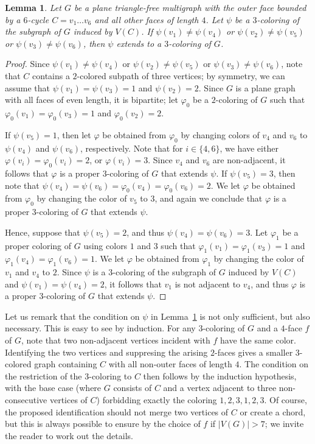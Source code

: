 \documentclass[12pt,twoside,openright,a4paper]{book}
\newtheorem{lemma}[theorem]{Lemma}
\begin{document}
\begin{lemma}\label{lemma:extend6}
Let $G$ be a plane triangle-free multigraph with the outer face bounded by a $6$-cycle $C=v_1\ldots v_6$ and all other
faces of length $4$.  Let $\psi$ be a $3$-coloring of the subgraph of $G$ induced by $V(C)$.
If $\psi(v_1)\neq\psi(v_4)$ or $\psi(v_2)\neq\psi(v_5)$ or $\psi(v_3)\neq\psi(v_6)$,
then $\psi$ extends to a $3$-coloring of $G$.
\end{lemma}
\begin{proof}
Since $\psi(v_1)\neq\psi(v_4)$ or $\psi(v_2)\neq\psi(v_5)$ or $\psi(v_3)\neq\psi(v_6)$, note that $C$ contains a $2$-colored subpath of
three vertices; by symmetry, we can assume that $\psi(v_1)=\psi(v_3)=1$ and $\psi(v_2)=2$.  Since $G$ is a plane graph with
all faces of even length, it is bipartite; let $\varphi_0$ be a $2$-coloring of $G$ such that $\varphi_0(v_1)=\varphi_0(v_3)=1$ and $\varphi_0(v_2)=2$.

If $\psi(v_5)=1$, then let $\varphi$ be obtained from $\varphi_0$ by changing colors of $v_4$ and $v_6$ to $\psi(v_4)$ and $\psi(v_6)$,
respectively.  Note that for $i\in \{4,6\}$, we have either $\varphi(v_i)=\varphi_0(v_i)=2$, or $\varphi(v_i)=3$.  Since $v_4$ and $v_6$
are non-adjacent, it follows that $\varphi$ is a proper $3$-coloring of $G$ that extends $\psi$.
If $\psi(v_5)=3$, then note that $\psi(v_4)=\psi(v_6)=\varphi_0(v_4)=\varphi_0(v_6)=2$.  We let $\varphi$ be obtained from $\varphi_0$ by changing the color of $v_5$ to $3$,
and again we conclude that $\varphi$ is a proper $3$-coloring of $G$ that extends $\psi$.

Hence, suppose that $\psi(v_5)=2$, and thus $\psi(v_4)=\psi(v_6)=3$.  Let $\varphi_1$ be a proper coloring of $G$ using colors $1$ and $3$
such that $\varphi_1(v_1)=\varphi_1(v_3)=1$ and $\varphi_1(v_4)=\varphi_1(v_6)=1$.  We let $\varphi$ be obtained from $\varphi_1$ by changing
the color of $v_1$ and $v_4$ to $2$.  Since $\psi$ is a $3$-coloring of the subgraph of $G$ induced by $V(C)$ and $\psi(v_1)=\psi(v_4)=2$,
it follows that $v_1$ is not adjacent to $v_4$, and thus $\varphi$ is a proper $3$-coloring of $G$ that extends $\psi$.
\end{proof}
Let us remark that the condition on $\psi$ in Lemma~\ref{lemma:extend6} is not only sufficient, but also necessary.
This is easy to see by induction. For any $3$-coloring of $G$ and a $4$-face $f$ of $G$, note that two non-adjacent vertices incident with $f$
have the same color.  Identifying the two vertices and suppresing the arising $2$-faces gives a smaller $3$-colored graph containing $C$
with all non-outer faces of length $4$.  The condition on the restriction of the $3$-coloring to $C$ then follows by the induction hypothesis,
with the base case (where $G$ consists of $C$ and a vertex adjacent to three non-consecutive vertices of $C$) forbidding exactly the
coloring $1,2,3,1,2,3$.  Of course, the proposed identification should not merge two vertices of $C$ or create a chord, but this is always
possible to ensure by the choice of $f$ if $|V(G)|>7$; we invite the reader to work out the details.
\end{document}
